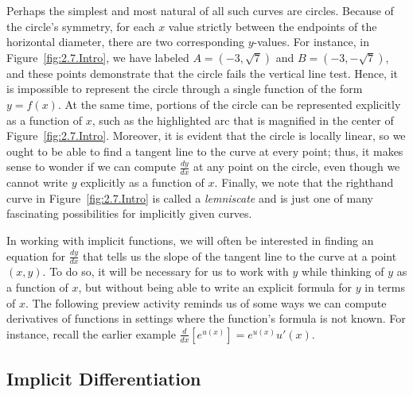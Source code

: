Perhaps the simplest and most natural of all such curves are circles.  Because of the circle's symmetry, for each $x$ value strictly between the endpoints of the horizontal diameter, there are two corresponding $y$-values.  For instance, in Figure~\ref{fig:2.7.Intro}, we have labeled $A = (-3,\sqrt{7})$ and $B = (-3,-\sqrt{7})$, and these points demonstrate that the circle fails the vertical line test.  Hence, it is impossible to represent the circle through a single function of the form $y = f(x)$.  At the same time, portions of the circle can be represented explicitly as a function of $x$, such as the highlighted arc that is magnified in the center of Figure~\ref{fig:2.7.Intro}.  Moreover, it is evident that the circle is locally linear, so we ought to be able to find a tangent line to the curve at every point; thus, it makes sense to wonder if we can compute $\frac{dy}{dx}$ at any point on the circle, even though we cannot write $y$ explicitly as a function of $x$.  Finally, we note that the righthand curve in Figure~\ref{fig:2.7.Intro} is called a \emph{lemniscate}  and is just one of many fascinating possibilities for implicitly given curves.

In working with implicit functions, we will often be interested in finding an equation for $\frac{dy}{dx}$ that tells us the slope of the tangent line to the curve at a point $(x,y)$.  To do so, it will be necessary for us to work with $y$ while thinking of $y$ as a function of $x$, but without being able to write an explicit formula for $y$ in terms of $x$.  The following preview activity reminds us of some ways we can compute derivatives of functions in settings where the function's formula is not known.  For instance, recall the earlier example $\frac{d}{dx}[e^{u(x)}] = e^{u(x)}u'(x)$.


\subsection*{Implicit Differentiation}

